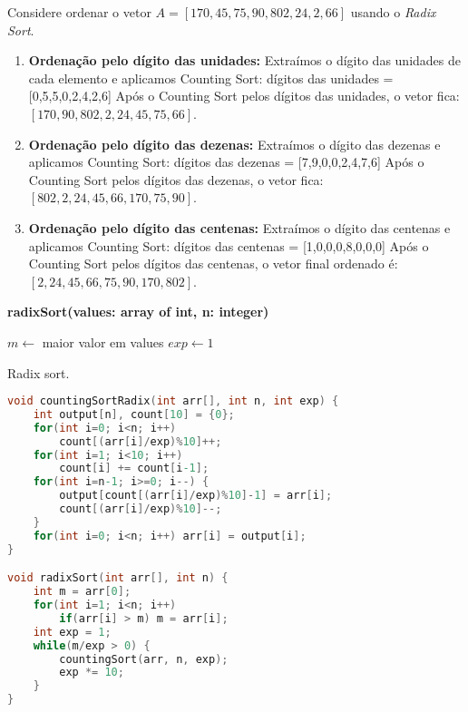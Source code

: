 \begin{exmp}
Considere ordenar o vetor $A = [170, 45, 75, 90, 802, 24, 2, 66]$ usando o \textit{Radix Sort}.  

\begin{enumerate}
    \item \textbf{Ordenação pelo dígito das unidades:}  
    Extraímos o dígito das unidades de cada elemento e aplicamos Counting Sort:  
    dígitos das unidades = [0,5,5,0,2,4,2,6]  
    Após o Counting Sort pelos dígitos das unidades, o vetor fica: $[170, 90, 802, 2, 24, 45, 75, 66]$.

    \item \textbf{Ordenação pelo dígito das dezenas:}  
    Extraímos o dígito das dezenas e aplicamos Counting Sort:  
    dígitos das dezenas = [7,9,0,0,2,4,7,6]  
    Após o Counting Sort pelos dígitos das dezenas, o vetor fica: $[802, 2, 24, 45, 66, 170, 75, 90]$.

    \item \textbf{Ordenação pelo dígito das centenas:}  
    Extraímos o dígito das centenas e aplicamos Counting Sort:  
    dígitos das centenas = [1,0,0,0,8,0,0,0]  
    Após o Counting Sort pelos dígitos das centenas, o vetor final ordenado é: $[2, 24, 45, 66, 75, 90, 170, 802]$.
\end{enumerate}
\end{exmp}


\begin{center}
\begin{minipage}{.9\linewidth}
\begin{algorithm}[H]
\DontPrintSemicolon
\textbf{radixSort(values: array of int, n: integer)}

$m \gets$ maior valor em values\;
$exp \gets 1$\;
\caption{Radix sort.}
\label{lab:alg-radixSort}
\end{algorithm}
\end{minipage}
\end{center}

\begin{lstlisting}[language=C,caption={Radix sort em C},captionpos=t]
void countingSortRadix(int arr[], int n, int exp) {
    int output[n], count[10] = {0};
    for(int i=0; i<n; i++)
        count[(arr[i]/exp)%10]++;
    for(int i=1; i<10; i++)
        count[i] += count[i-1];
    for(int i=n-1; i>=0; i--) {
        output[count[(arr[i]/exp)%10]-1] = arr[i];
        count[(arr[i]/exp)%10]--;
    }
    for(int i=0; i<n; i++) arr[i] = output[i];
}

void radixSort(int arr[], int n) {
    int m = arr[0];
    for(int i=1; i<n; i++)
        if(arr[i] > m) m = arr[i];
    int exp = 1;
    while(m/exp > 0) {
        countingSort(arr, n, exp);
        exp *= 10;
    }
}
\end{lstlisting}

